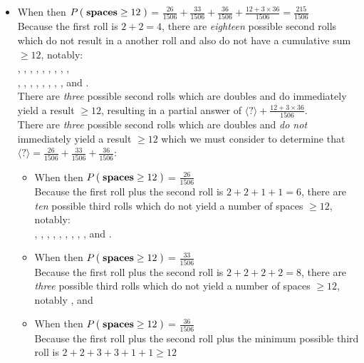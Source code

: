 \documentclass{ProblemSetCUNY}
\newcommand{\Prob}[1]{\ensuremath{P\Parens{#1}}\xspace}
\begin{document}
\begin{itemize}
\item When  then \Prob{\textbf{spaces} \ge 12} = $ \frac{26}{1506} + \frac{33}{1506} + \frac{36}{1506} + \frac{12 + 3 \times 36}{1506} = \frac{215}{1506}$\\
Because the first roll is $2 + 2 = 4$, there are \emph{eighteen} possible second rolls which do not result in a another roll and also do not have a cumulative sum $\ge 12$, notably:\\
, , ,  , , , , , ,\\
, , , , , , , , and .\\
There are \emph{three} possible second rolls which are doubles and do immediately yield a result $\ge 12$, resulting in a partial answer of $\langle?\rangle + \frac{12 + 3 \times 36}{1506}$.\\
There are \emph{three} possible second rolls which are doubles and \emph{do not} immediately yield a result $\ge 12$ which we must consider to determine that $\langle?\rangle = \frac{26}{1506} + \frac{33}{1506} + \frac{36}{1506}$:
\begin{itemize}
\item When  then \Prob{\textbf{spaces} \ge 12} = $\frac{26}{1506}$\\
Because the first roll plus the second roll is $2 + 2 + 1 + 1 = 6$, there are \emph{ten} possible third rolls which do not yield a number of spaces $\ge 12$, notably:\\
, , , ,  , , , , , and .
\item When  then \Prob{\textbf{spaces} \ge 12} = $\frac{33}{1506}$\\
Because the first roll plus the second roll is $2 + 2 + 2 + 2 = 8$, there are \emph{three} possible third rolls which do not yield a number of spaces $\ge 12$, notably  ,  and 
\item When  then \Prob{\textbf{spaces} \ge 12} = $\frac{36}{1506}$\\
Because the first roll plus the second roll plus the minimum possible third roll is $2 + 2 + 3 + 3 + 1 + 1 \ge 12$
\end{itemize}


\end{itemize}
\end{document}
